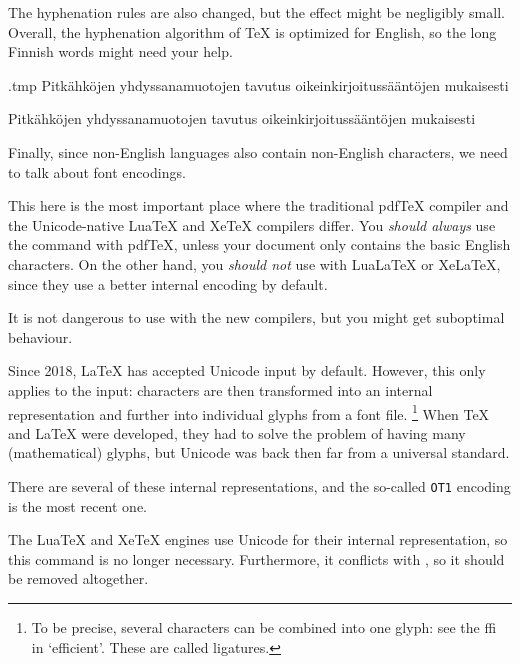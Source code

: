 The hyphenation rules are also changed,
but the effect might be negligibly small.
Overall, the hyphenation algorithm of \TeX{} is optimized for English,
so the long Finnish words might need your help.
\begin{VerbatimOut}{\jobname.tmp}
Pitkähköjen yhdyssanamuotojen tavutus
oikeinkirjoitussääntöjen mukaisesti\\

\begin{otherlanguage}{finnish}
Pitkähköjen yhdyssanamuotojen tavutus
oikeinkirjoitussääntöjen mukaisesti
\end{otherlanguage}
\end{VerbatimOut}
\ShowExample

Finally, since non-English languages also contain non-English characters,
we need to talk about font encodings.

\begin{gotcha}\label{rem:font encoding}
This here is the most important place where the traditional pdfTeX compiler
and the Unicode-native LuaTeX and XeTeX compilers differ.
You \emph{should always} use the  command with pdfTeX,
unless your document only contains the basic English characters.
On the other hand, you \emph{should not} use  with LuaLaTeX or XeLaTeX,
since they use a better internal encoding by default.

It is not dangerous to use  with the new compilers,
but you might get suboptimal  behaviour.
\end{gotcha}

Since 2018, \LaTeX{} has accepted Unicode input by default.
However, this only applies to the input:
characters are then transformed into an internal representation
and further into individual glyphs from a font file.%
\footnote{To be precise, several characters can be combined into one glyph:
see the ffi in `efficient'.
These are called ligatures.}
When \TeX{} and \LaTeX{} were developed,
they had to solve the problem of having many (mathematical) glyphs,
but Unicode was back then far from a universal standard.

There are several of these internal representations,
and the so-called \verb|OT1| encoding is the most recent one.

The LuaTeX and XeTeX engines use Unicode for their internal representation,
so this command is no longer necessary.
Furthermore, it conflicts with ,
so it should be removed altogether.

